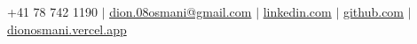 \documentclass[letterpaper,11pt]{article}
\begin{document}
\vspace{5mm}

\begin{center}
\small +41 78 742 1190 $|$
\href{mailto:dion.08osmani@gmail.com}{dion.08osmani@gmail.com} $|$
\href{https://www.linkedin.com/in/dion-osmani-60478720b/}{linkedin.com} $|$
\href{https://github.com/dij0s/}{github.com} $|$
\href{https://dionosmani.vercel.app}{dionosmani.vercel.app}
\end{center}
\end{document}
